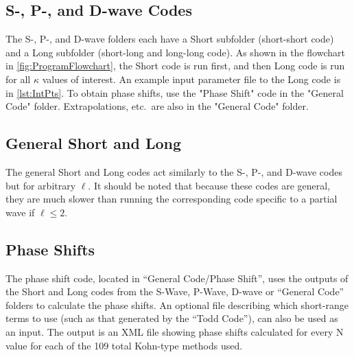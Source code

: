 \documentclass[Dissertation.tex]{subfiles}
\begin{document}
\subsection*{S-, P-, and D-wave Codes}
The S-, P-, and D-wave folders each have a Short subfolder (short-short
code) and a Long subfolder (short-long and long-long code). As shown in
the flowchart in \cref{fig:ProgramFlowchart}, the Short code is run first,
and then Long code is run for all $\kappa$ values of interest. An example
input parameter file to the Long code is in \cref{lst:IntPts}. To obtain
phase shifts, use the "Phase Shift" code in the "General Code" folder.
Extrapolations, etc.\ are also in the "General Code" folder.

\subsection*{General Short and Long}
The general Short and Long codes act similarly to the S-, P-, and D-wave
codes but for arbitrary $\ell$. It should be noted that because these
codes are general, they are much slower than running the corresponding
code specific to a partial wave if $\ell \leq 2$.


%
%
%
%
%

\subsection*{Phase Shifts}
The phase shift code, located in ``General Code/Phase Shift'', uses the
outputs of the Short and Long codes from the S-Wave, P-Wave, D-wave or
``General Code'' folders to calculate the phase shifts. An optional file
describing which short-range terms to use (such as that generated by the
``Todd Code''), can also be used as an input. The output is an XML file
showing phase shifts calculated for every N value for each of the 109
total Kohn-type methods used.
\end{document}
